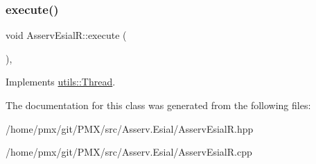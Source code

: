 \subsubsection{\texorpdfstring{execute()}{execute()}}
{\footnotesize\ttfamily void Asserv\+Esial\+R\+::execute (\begin{DoxyParamCaption}{ }\end{DoxyParamCaption})\hspace{0.3cm}{\ttfamily [protected]}, {\ttfamily [virtual]}}


\begin{DoxyItemize}
\item 
\end{DoxyItemize}

Implements \hyperlink{classutils_1_1Thread_a202b3fabad41b3be6d996043b262a43a}{utils\+::\+Thread}.



The documentation for this class was generated from the following files\+:\begin{DoxyCompactItemize}
\item 
/home/pmx/git/\+P\+M\+X/src/\+Asserv.\+Esial/Asserv\+Esial\+R.\+hpp\item 
/home/pmx/git/\+P\+M\+X/src/\+Asserv.\+Esial/Asserv\+Esial\+R.\+cpp\end{DoxyCompactItemize}
